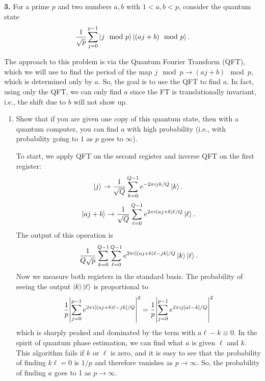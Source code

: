 \documentclass{article}
\theoremstyle{definition}
\newcommand{\f}[2]{\frac{#1}{#2}}
\begin{document}
\noindent \textbf{3. } For a prime $p$ and two numbers $a,b$ with $1 < a, b < p$, consider the quantum state
\begin{align*}
\f{1}{\sqrt{p}} \sum^{p-1}_{j=0} \ket{ j \mod p } \ket{(aj + b) \mod p}.
\end{align*}

\noindent The approach to this problem is via the Quantum Fourier Transform (QFT), which we will use to find the period of the map $j \mod p \to (aj + b) \mod p$, which is determined only by $a$. So, the goal is to use the QFT to find $a$. In fact, using only the QFT, we can only find $a$ since the FT is translationally invariant, i.e., the shift due to $b$ will not show up.   

\begin{enumerate}[label=(\alph*)]

\item Show that if you are given one copy of this quantum state, then with a quantum computer, you can find $a$ with high probability (i.e., with probability going to $1$ as $p$ goes to $\infty$). 

\noindent To start, we apply QFT on the second register and inverse QFT on the first register:
\begin{align*}
	\ket{j} \to  \f{1}{\sqrt{Q}} \sum_{k=0}^{Q-1} e^{-2\pi i jk/Q} \ket{k}.
\end{align*}
\begin{align*}
	\ket{aj + b} \to  \f{1}{\sqrt{Q}} \sum_{\ell=0}^{Q-1} e^{2\pi i (aj+b) \ell / Q} \ket{\ell}. 
\end{align*}
The output of this operation is 
\begin{align*}
	\f{1}{Q\sqrt{p}}   \sum_{k=0}^{Q-1} \sum_{\ell=0}^{Q-1} e^{2\pi i [ (aj+b)\ell - jk]  /Q } \ket{k} \ket{\ell}.
\end{align*}
Now we measure both registers in the standard basis. The probability of seeing the output $\ket{k}\ket{\ell}$ is proportional to
\begin{align*}
	\f{1}{p}\abs{\sum_{j=0}^{p-1} e^{2\pi i [ (aj+b)\ell - jk]  /Q }}^2 =  \f{1}{p}	\abs{\sum_{j=0}^{p-1} e^{2\pi i j [ a\ell - k]  /Q }}^2
\end{align*}
which is sharply peaked and dominated by the term with $a\ell - k \equiv 0$.  In the spirit of quantum phase estimation, we can find what $a$ is given $\ell$ and $k$. This algorithm fails if $k$ or $\ell$ is zero, and it is easy to see that the probability of finding $k\ell = 0$ is $1/p$ and therefore vanishes as $p \to \infty$. So, the probability of finding $a$ goes to 1 as $p\to \infty$. 


\end{enumerate}
\end{document}
